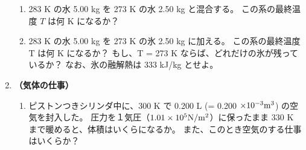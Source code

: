\documentclass[uplatex,dvipdfmx,a4paper,11pt]{jsarticle}
\begin{document}
\begin{enumerate}
\begin{enumerate}
\item
283 K の水 5.00 kg を 273 K の水 2.50 kg と混合する。
この系の最終温度 $T$ は何 K になるか？

%

\item
283 K の水 5.00 kg を 273 K の氷 2.50 kg に加える。
この系の最終温度 T は何 K になるか？
もし、T = 273 K ならば、どれだけの氷が残っているか？
なお、氷の融解熱は 333 kJ/kg とせよ。

%
%
%

\end{enumerate}


\item 
{\bf （気体の仕事）}

\begin{enumerate}
\item
ピストンつきシリンダ中に、300 K で 0.200 L (= 0.200 $\times 10^{-3} {\rm m}^3$) の空気を封入した。
圧力を１気圧（$1.01 \times 10^5 {\rm N}/{\rm m}^2$）に保ったまま 330 K まで暖めると、体積はいくらになるか。
また、このとき空気のする仕事はいくらか？


\end{enumerate}
\end{enumerate}
\end{document}
